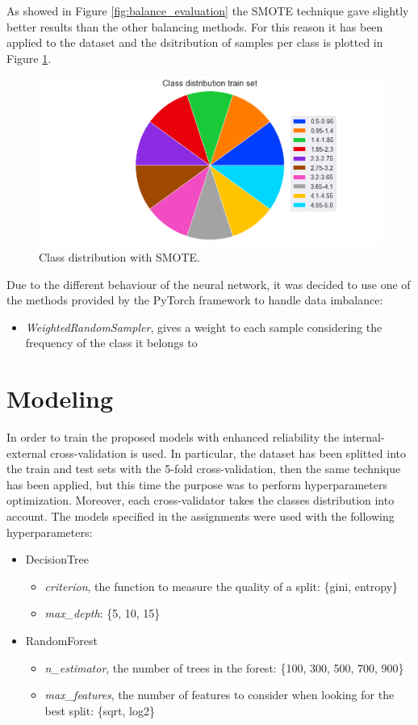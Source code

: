 \documentclass[../main]{subfiles}
\begin{document}
As showed in Figure \ref{fig:balance_evaluation} the SMOTE technique gave slightly better results than the other balancing methods.
For this reason it has been applied to the dataset and the dsitribution of samples per class is plotted in Figure \ref{fig:class_distribuition_balance}.
\begin{figure}[h]
    \center
    \includegraphics[width=0.6\linewidth]{figures/class_distribution_smote.png}
    \caption{Class distribution  with SMOTE.}
    \label{fig:class_distribuition_balance}
\end{figure}

Due to the different behaviour of the neural network, it was decided to use one of the methods provided by the PyTorch framework to handle data imbalance:
\begin{itemize}
    \item \textit{WeightedRandomSampler}, gives a weight to each sample considering the frequency of the class it belongs to
\end{itemize}
\newpage

\section{Modeling}
In order to train the proposed models with enhanced reliability the internal-external cross-validation is used.
In particular, the dataset has been splitted into the train and test sets with the 5-fold cross-validation, then the same technique has been applied, but this time the purpose was to perform hyperparameters optimization.
Moreover, each cross-validator takes the classes distribution into account.
The models specified in the assignments were used with the following hyperparameters:
\begin{itemize}
    \item DecisionTree
    \begin{itemize}
        \item \textit{criterion}, the function to measure the quality of a split: \{gini, entropy\}
        \item \textit{max\_depth}: \{5, 10, 15\}
    \end{itemize}
    \item RandomForest
    \begin{itemize}
        \item \textit{n\_estimator}, the number of trees in the forest: \{100, 300, 500, 700, 900\}
        \item \textit{max\_features}, the number of features to consider when looking for the best split: \{sqrt, log2\}
    \end{itemize} 
\end{itemize}
\end{document}
